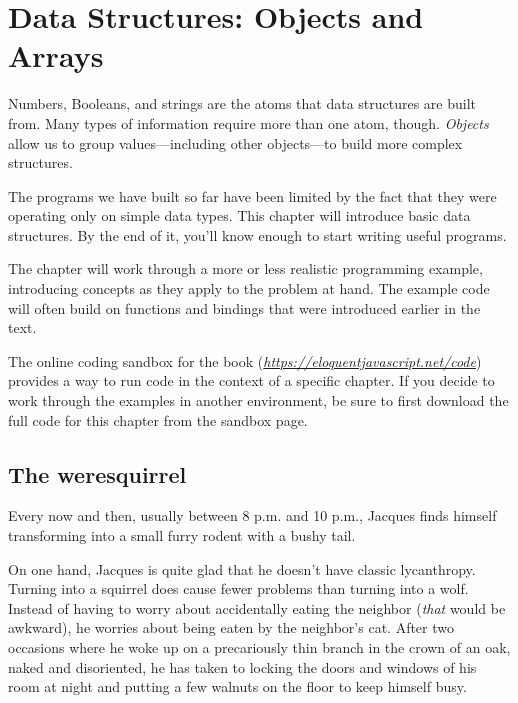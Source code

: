 \chapter{Data Structures: Objects and Arrays}\label{data}


Numbers, Booleans, and strings are the atoms that data structures are built from. Many types of information require more than one atom, though. \emph{Objects} allow us to group values—including other objects—to build more complex structures.

The programs we have built so far have been limited by the fact that they were operating only on simple data types. This chapter will introduce basic data structures. By the end of it, you'll know enough to start writing useful programs.

The chapter will work through a more or less realistic programming example, introducing concepts as they apply to the problem at hand. The example code will often build on functions and bindings that were introduced earlier in the text.

The online coding sandbox for the book (\href{https://eloquentjavascript.net/code}{\emph{https://eloquentjavascript.net\slash code}}) provides a way to run code in the context of a specific chapter. If you decide to work through the examples in another environment, be sure to first download the full code for this chapter from the sandbox page.

\section{The weresquirrel}

Every now and then, usually between 8 p.m. and 10 p.m., Jacques finds himself transforming into a small furry rodent with a bushy tail.

On one hand, Jacques is quite glad that he doesn't have classic lycanthropy. Turning into a squirrel does cause fewer problems than turning into a wolf. Instead of having to worry about accidentally eating the neighbor (\emph{that} would be awkward), he worries about being eaten by the neighbor's cat. After two occasions where he woke up on a precariously thin branch in the crown of an oak, naked and disoriented, he has taken to locking the doors and windows of his room at night and putting a few walnuts on the floor to keep himself busy.


